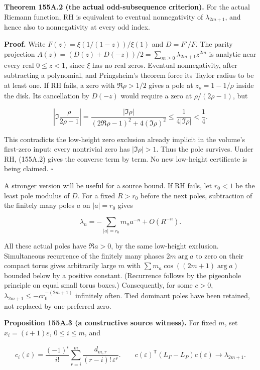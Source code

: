 \documentclass[
  11pt,
]{book}
\begin{document}
\textbf{Theorem 155A.2 (the actual odd-subsequence criterion).} For the
actual Riemann function, RH is equivalent to eventual nonnegativity of
\(\lambda_{2m+1}\), and hence also to nonnegativity at every odd index.

\textbf{Proof.} Write \(F(z)=\xi(1/(1-z))/\xi(1)\) and \(D=F'/F\). The
parity projection
\(A(z)=(D(z)+D(-z))/2=\sum_{m\ge0}\lambda_{2m+1}z^{2m}\) is analytic
near every real \(0\le z<1\), since \(\xi\) has no real zeros. Eventual
nonnegativity, after subtracting a polynomial, and Pringsheim's theorem
force its Taylor radius to be at least one. If RH fails, a zero with
\(\Re\rho>1/2\) gives a pole at \(z_\rho=1-1/\rho\) inside the disk. Its
cancellation by \(D(-z)\) would require a zero at \(\rho/(2\rho-1)\),
but

\[
\left|\Im\frac{\rho}{2\rho-1}\right|
=\frac{|\Im\rho|}{(2\Re\rho-1)^2+4(\Im\rho)^2}
\le\frac1{4|\Im\rho|}<\frac14.
\]

This contradicts the low-height zero exclusion already implicit in the
volume's first-zero input: every nontrivial zero has \(|\Im\rho|>1\).
Thus the pole survives. Under RH, (155A.2) gives the converse term by
term. No new low-height certificate is being claimed. \(\square\)

A stronger version will be useful for a source bound. If RH fails, let
\(r_0<1\) be the least pole modulus of \(D\). For a fixed \(R>r_0\)
before the next poles, subtraction of the finitely many poles \(a\) on
\(|a|=r_0\) gives

\[
\lambda_n=-\sum_{|a|=r_0}m_a a^{-n}+O(R^{-n}).
\tag{155A.5}
\]

All these actual poles have \(\Re a>0\), by the same low-height
exclusion. Simultaneous recurrence of the finitely many phases
\(2m\arg a\) to zero on their compact torus gives arbitrarily large
\(m\) with \(\sum m_a\cos((2m+1)\arg a)\) bounded below by a positive
constant. (Recurrence follows by the pigeonhole principle on equal small
torus boxes.) Consequently, for some \(c>0\),
\(\lambda_{2m+1}\le-c r_0^{-(2m+1)}\) infinitely often. Tied dominant
poles have been retained, not replaced by one preferred zero.

\textbf{Proposition 155A.3 (a constructive source witness).} For fixed
\(m\), set \(x_i=(i+1)\varepsilon\), \(0\le i\le m\), and

\[
c_i(\varepsilon)=\frac{(-1)^i}{i!}
 \sum_{r=i}^m\frac{d_{m,r}}{(r-i)!\,\varepsilon^r}.
\qquad
\boxed{c(\varepsilon)^{\mathsf T}(L_\Gamma-L_P)c(\varepsilon)
 \longrightarrow\lambda_{2m+1}.}
\tag{155A.6}
\]
\end{document}
